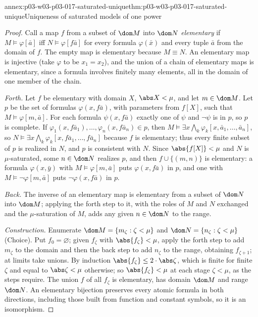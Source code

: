 \begin{annexitem}{annex:p03-w03-p03-017-saturated-unique}{thm:p03-w03-p03-017-saturated-unique}{Uniqueness of saturated models of one power}
\begin{proof}
Call a map \(f\) from a subset of \(\dom M\) into \(\dom N\)
\emph{elementary} if \(M\models\varphi[\bar a]\) iff
\(N\models\varphi[f\bar a]\) for every formula \(\varphi(\bar x)\) and every
tuple \(\bar a\) from the domain of \(f\).  The empty map is elementary
because \(M\equiv N\).  An elementary map is injective (take \(\varphi\) to
be \(x_1=x_2\)), and the union of a chain of elementary maps is elementary,
since a formula involves finitely many elements, all in the domain of one
member of the chain.

\emph{Forth.}  Let \(f\) be elementary with domain \(X\), \(\abs X<\mu\), and
let \(m\in\dom M\).  Let \(p\) be the set of formulas
\(\varphi(x,f\bar a)\), with parameters from \(f[X]\), such that
\(M\models\varphi[m,\bar a]\).  For each formula \(\psi(x,f\bar a)\) exactly
one of \(\psi\) and \(\neg\psi\) is in \(p\), so \(p\) is complete.  If
\(\varphi_1(x,f\bar a_1),\ldots,\varphi_n(x,f\bar a_n)\in p\), then
\(M\models\exists x\bigwedge_k\varphi_k[x,\bar a_1,\ldots,\bar a_n]\), so
\(N\models\exists x\bigwedge_k\varphi_k[x,f\bar a_1,\ldots,f\bar a_n]\)
because \(f\) is elementary; thus every finite subset of \(p\) is realized
in \(N\), and \(p\) is consistent with \(N\).  Since \(\abs{f[X]}<\mu\) and
\(N\) is \(\mu\)-saturated, some \(n\in\dom N\) realizes \(p\), and then
\(f\cup\{(m,n)\}\) is elementary: a formula \(\varphi(x,\bar y)\) with
\(M\models\varphi[m,\bar a]\) puts \(\varphi(x,f\bar a)\) in \(p\), and one
with \(M\models\neg\varphi[m,\bar a]\) puts \(\neg\varphi(x,f\bar a)\) in
\(p\).

\emph{Back.}  The inverse of an elementary map is elementary from a subset
of \(\dom N\) into \(\dom M\); applying the forth step to it, with the roles
of \(M\) and \(N\) exchanged and the \(\mu\)-saturation of \(M\), adds any
given \(n\in\dom N\) to the range.

\emph{Construction.}  Enumerate \(\dom M=\{m_\zeta:\zeta<\mu\}\) and
\(\dom N=\{n_\zeta:\zeta<\mu\}\) (Choice).  Put \(f_0=\varnothing\); given
\(f_\zeta\) with \(\abs{f_\zeta}<\mu\), apply the forth step to add
\(m_\zeta\) to the domain and then the back step to add \(n_\zeta\) to the
range, obtaining \(f_{\zeta+1}\); at limits take unions.  By induction
\(\abs{f_\zeta}\le2\cdot\abs\zeta\), which is finite for finite \(\zeta\)
and equal to \(\abs\zeta<\mu\) otherwise; so \(\abs{f_\zeta}<\mu\) at each
stage \(\zeta<\mu\), as the steps require.  The union \(f\) of all
\(f_\zeta\) is elementary, has domain \(\dom M\) and range \(\dom N\).  An
elementary bijection preserves every atomic formula in both directions,
including those built from function and constant symbols, so it is an
isomorphism.
\end{proof}
\end{annexitem}


